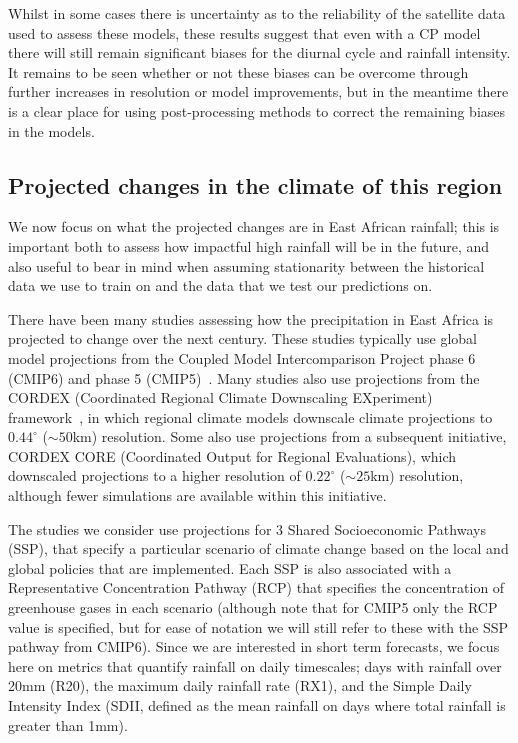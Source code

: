 \documentclass[../main.tex]{subfiles}
\begin{document}
Whilst in some cases there is uncertainty as to the reliability of the satellite data used to assess these models, these results suggest that even with a CP model there will still remain significant biases for the diurnal cycle and rainfall intensity. It remains to be seen whether or not these biases can be overcome through further increases in resolution or model improvements, but in the meantime there is a clear place for using post-processing methods to correct the remaining biases in the models.





\subsection{Projected changes in the climate of this region}

We now focus on what the projected changes are in East African rainfall; this is important both to assess how impactful high rainfall will be in the future, and also useful to bear in mind when assuming stationarity between the historical data we use to train on and the data that we test our predictions on.

There have been many studies assessing how the precipitation in East Africa is projected to change over the next century. These studies typically use global model projections from the Coupled Model Intercomparison Project phase 6 (CMIP6) and phase 5 (CMIP5)~\citep{taylor_overview_2012, eyring_overview_2016}. Many studies also use projections from the CORDEX (Coordinated Regional Climate Downscaling EXperiment) framework~\citep{giorgi_regional_2015}, in which regional climate models downscale climate projections to $0.44^{\circ}$ ($\sim50$km) resolution. Some also use projections from a subsequent initiative, CORDEX CORE (Coordinated Output for Regional Evaluations), which downscaled projections to a higher resolution of $0.22^{\circ}$ ($\sim25$km) resolution, although fewer simulations are available within this initiative.  

The studies we consider use projections for 3 Shared Socioeconomic Pathways (SSP), that specify a particular scenario of climate change based on the local and global policies that are implemented. Each SSP is also associated with a Representative Concentration Pathway (RCP) that specifies the concentration of greenhouse gases in each scenario (although note that for CMIP5 only the RCP value is specified, but for ease of notation we will still refer to these with the SSP pathway from CMIP6). Since we are interested in short term forecasts, we focus here on metrics that quantify rainfall on daily timescales; days with rainfall over 20mm (R20), the maximum daily rainfall rate (RX1), and the Simple Daily Intensity Index (SDII, defined as the mean rainfall on days where total rainfall is greater than 1mm).
\end{document}
